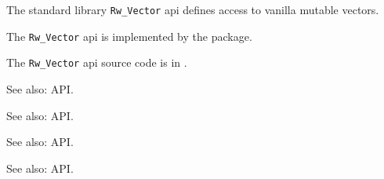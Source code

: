 
The standard library {\tt Rw\_Vector} api defines access to vanilla mutable vectors.

The {\tt Rw\_Vector} api is implemented by the 
package.

The {\tt Rw\_Vector} api source code is in .

See also:   API.

See also:   API.

See also:   API.

See also:   API.